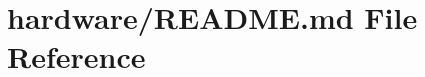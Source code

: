 \hypertarget{hardware_2README_8md}{\section{hardware/\-R\-E\-A\-D\-M\-E.md File Reference}
\label{hardware_2README_8md}
}
